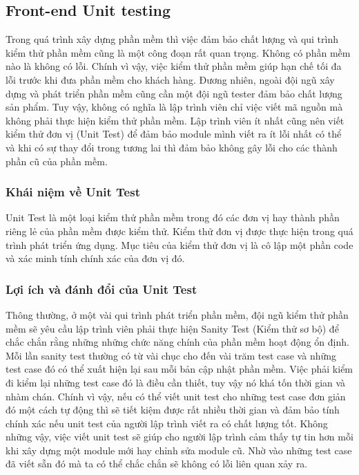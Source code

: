 			 	\subsection{Front-end Unit testing}
			 	Trong quá trình xây dựng phần mềm thì việc đảm bảo chất lượng và qui trình kiểm thử phần mềm cũng là một công đoạn rất quan trọng. Không có phần mềm nào là không có lỗi. Chính vì vậy, việc kiểm thử phần mềm giúp hạn chế tối đa lỗi trước khi đưa phần mềm cho khách hàng. Đương nhiên, ngoài đội ngũ xây dựng và phát triển phần mềm cũng cần một đội ngũ tester đảm bảo chất lượng sản phẩm. Tuy vậy, không có nghĩa là lập trình viên chỉ việc viết mã nguồn mà không phải thực hiện kiểm thử phần mềm. Lập trình viên ít nhất cũng nên viết kiểm thử đơn vị (Unit Test) để đảm bảo module mình viết ra ít lỗi nhất có thể và khi có sự thay đổi trong tương lai thì đảm bảo không gây lỗi cho các thành phần cũ của phần mềm.
			 	
			 	\subsubsection{Khái niệm về Unit Test}
			 	Unit Test là một loại kiểm thử phần mềm trong đó các đơn vị hay thành phần riêng lẻ của phần mềm được kiểm thử. Kiểm thử đơn vị được thực hiện trong quá trình phát triển ứng dụng. Mục tiêu của kiểm thử đơn vị là cô lập một phần code và xác minh tính chính xác của đơn vị đó.
			 	
			 	\subsubsection{Lợi ích và đánh đổi của Unit Test}
			 	Thông thường, ở một vài qui trình phát triển phần mềm, đội ngũ kiểm thử phần mềm sẽ yêu cầu lập trình viên phải thực hiện Sanity Test (Kiểm thử sơ bộ) để chắc chắn rằng những những chức năng chính của phần mềm hoạt động ổn định. Mỗi lần sanity test thường có từ vài chục cho đến vài trăm test case và những test case đó có thể xuất hiện lại sau mỗi bản cập nhật phần mềm. Việc phải kiểm đi kiểm lại những test case đó là điều cần thiết, tuy vậy nó khá tốn thời gian và nhàm chán. Chính vì vậy, nếu có thể viết unit test cho những test case đơn giản đó một cách tự động thì sẽ tiết kiệm được rất nhiều thời gian và đảm bảo tính chính xác nếu unit test của người lập trình viết ra có chất lượng tốt. Không những vậy, việc viết unit test sẽ giúp cho người lập trình cảm thấy tự tin hơn mỗi khi xây dựng một module mới hay chỉnh sửa module cũ. Nhờ vào những test case đã viết sẵn đó mà ta có thể chắc chắn sẽ không có lỗi liên quan xảy ra.\\
			 	
